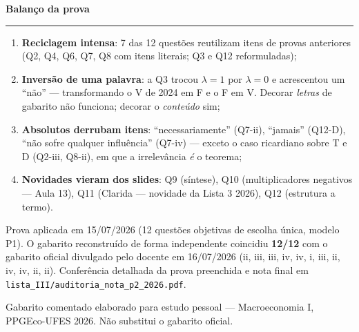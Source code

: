 \documentclass[12pt, a4paper]{article}
\begin{document}
\newpage
\begin{center}
{\large\bfseries\color{orangerbc} Balanço da prova}\\[0.2em]
\rule{\linewidth}{0.6pt}
\end{center}

\begin{resultbox}[title={O que esta prova confirma sobre o padrão do docente}]
\begin{enumerate}[leftmargin=1.6em, itemsep=0.2em]
\item \textbf{Reciclagem intensa}: 7 das 12 questões reutilizam itens de
provas anteriores (Q2, Q4, Q6, Q7, Q8 com itens literais; Q3 e Q12
reformuladas);
\item \textbf{Inversão de uma palavra}: a Q3 trocou $\lambda=1$ por
$\lambda=0$ e acrescentou um ``não'' --- transformando o V de 2024 em F e o F
em V. Decorar \emph{letras} de gabarito não funciona; decorar o
\emph{conteúdo} sim;
\item \textbf{Absolutos derrubam itens}: ``necessariamente'' (Q7-ii),
``jamais'' (Q12-D), ``não sofre qualquer influência'' (Q7-iv) --- exceto o
caso ricardiano sobre T e D (Q2-iii, Q8-ii), em que a irrelevância \emph{é} o
teorema;
\item \textbf{Novidades vieram dos slides}: Q9 (síntese), Q10 (multiplicadores
negativos --- Aula 13), Q11 (Clarida --- novidade da Lista 3 2026), Q12
(estrutura a termo).
\end{enumerate}
\end{resultbox}

\begin{provabox}[title={Registro}]
Prova aplicada em 15/07/2026 (12 questões objetivas de escolha única, modelo
P1). O gabarito reconstruído de forma independente coincidiu \textbf{12/12}
com o gabarito oficial divulgado pelo docente em 16/07/2026 (ii, iii, iii,
iv, iv, i, iii, ii, iv, iv, ii, ii). Conferência detalhada da prova
preenchida e nota final em
\texttt{lista\_III/auditoria\_nota\_p2\_2026.pdf}.
\end{provabox}

\vfill
{\small\color{grayrbc} Gabarito comentado elaborado para estudo pessoal ---
Macroeconomia I, PPGEco-UFES 2026. Não substitui o gabarito oficial.}
\end{document}
